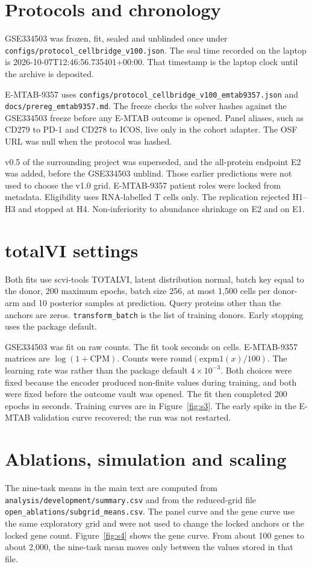 \documentclass[10pt,a4paper]{article}
\begin{document}
\section{Protocols and chronology}
GSE334503 was frozen, fit, sealed and unblinded once under \texttt{configs/protocol\_cellbridge\_v100.json}. The seal time recorded on the laptop is 2026-10-07T12:46:56.735401+00:00. That timestamp is the laptop clock until the archive is deposited.

E-MTAB-9357 uses \texttt{configs/protocol\_cellbridge\_v100\_emtab9357.json} and \texttt{docs/prereg\_emtab9357.md}. The freeze checks the solver hashes against the GSE334503 freeze before any E-MTAB outcome is opened. Panel aliases, such as CD279 to PD-1 and CD278 to ICOS, live only in the cohort adapter. The OSF URL was null when the protocol was hashed.

v0.5 of the surrounding project was superseded, and the all-protein endpoint E2 was added, before the GSE334503 unblind. Those earlier predictions were not used to choose the v1.0 grid. E-MTAB-9357 patient roles were locked from metadata. Eligibility uses RNA-labelled T cells only. The replication rejected H1--H3 and stopped at H4. Non-inferiority to abundance shrinkage \EmNiEtwoHold{} on E2 and \EmNiEoneHold{} on E1.

\section{totalVI settings}
Both fits use scvi-tools TOTALVI, latent distribution normal, batch key equal to the donor, 200 maximum epochs, batch size 256, at most 1{,}500 cells per donor-arm and 10 posterior samples at prediction. Query proteins other than the anchors are zeros. \texttt{transform\_batch} is the list of training donors. Early stopping uses the package default.

GSE334503 was fit on raw counts. The fit took \GseTvSeconds{} seconds on \GseTvCells{} cells. E-MTAB-9357 matrices are \(\log(1+\mathrm{CPM})\). Counts were \(\mathrm{round}(\mathrm{expm1}(x)/100)\). The learning rate was \EmLr{} rather than the package default \(4\times 10^{-3}\). Both choices were fixed because the encoder produced non-finite values during training, and both were fixed before the outcome vault was opened. The fit then completed 200 epochs in \EmTvSeconds{} seconds. Training curves are in Figure~\ref{fig:s3}. The early spike in the E-MTAB validation curve recovered; the run was not restarted.

\section{Ablations, simulation and scaling}
The nine-task means in the main text are computed from \texttt{analysis/development/summary.csv} and from the reduced-grid file \texttt{open\_ablations/subgrid\_means.csv}. The panel curve and the gene curve use the same exploratory grid and were not used to change the locked anchors or the locked gene count. Figure~\ref{fig:s4} shows the gene curve. From about 100 genes to about 2{,}000, the nine-task mean moves only between the values stored in that file.
\end{document}
